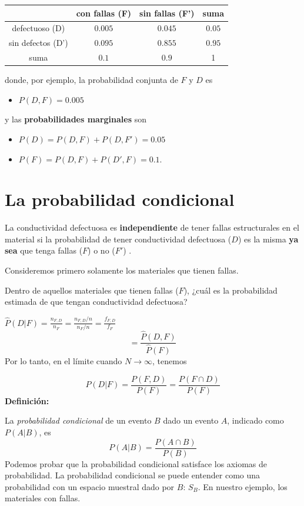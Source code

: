 \documentclass[
]{book}
\providecommand{\tightlist}{%
  \setlength{\itemsep}{0pt}\setlength{\parskip}{0pt}}
\begin{document}
\begin{longtable}[]{@{}cccc@{}}
\toprule\noalign{}
& con fallas (F) & sin fallas (F') & suma \\
\midrule\noalign{}
\endhead
\bottomrule\noalign{}
\endlastfoot
defectuoso (D) & \(0.005\) & \(0.045\) & \(0.05\) \\
sin defectos (D') & \(0.095\) & \(0.855\) & \(0.95\) \\
suma & \(0.1\) & \(0.9\) & 1 \\
\end{longtable}

donde, por ejemplo, la probabilidad conjunta de \(F\) y \(D\) es

\begin{itemize}
\tightlist
\item
  \(P(D,F)=0.005\)
\end{itemize}

y las \textbf{probabilidades marginales} son

\begin{itemize}
\tightlist
\item
  \(P(D)=P(D, F) + P(D, F')=0.05\)
\item
  \(P(F)=P(D, F) + P(D', F)= 0.1\).
\end{itemize}

\hypertarget{la-probabilidad-condicional}{%
\section{La probabilidad condicional}\label{la-probabilidad-condicional}}

La conductividad defectuosa es \textbf{independiente} de tener fallas estructurales en el material si la probabilidad de tener conductividad defectuosa (\(D\)) es la misma \textbf{ya sea} que tenga fallas (\(F\)) o no (\(F'\)) .

Consideremos primero solamente los materiales que tienen fallas.

Dentro de aquellos materiales que tienen fallas (\(F\)), ¿cuál es la probabilidad estimada de que tengan conductividad defectuosa?

\(\hat{P}(D|F)=\frac{n_{F,D}}{n_{F}}=\frac{n_{F,D}/n}{n_{F}/n}= \frac{f_{F,D}}{f_{F}}\)
\[= \frac{\hat{P}(D,F)}{\hat{P}(F)}\]
Por lo tanto, en el límite cuando \(N \rightarrow \infty\), tenemos

\[P(D|F)=\frac{P(F, D)}{P(F)}=\frac{P(F \cap D)}{P(F)}\]
\textbf{Definición:}

La \emph{probabilidad condicional} de un evento \(B\) dado un evento \(A\), indicado como \(P(A|B)\), es
\[P(A|B) = \frac{P(A\cap B)}{P(B)}\]
Podemos probar que la probabilidad condicional satisface los axiomas de probabilidad. La probabilidad condicional se puede entender como una probabilidad con un espacio muestral dado por \(B\): \(S_B\). En nuestro ejemplo, los materiales con fallas.
\end{document}
